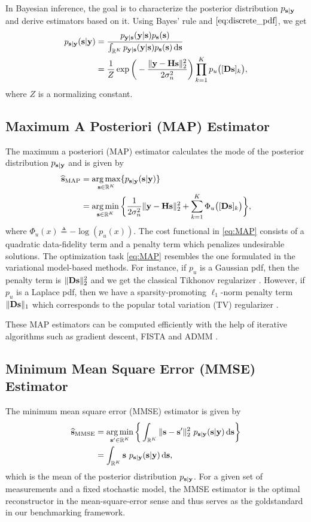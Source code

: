 \documentclass[journal]{IEEEtran}
\begin{document}
In Bayesian inference, the goal is to characterize the posterior distribution $p_{{\bf{s}}|{\bf{y}}}$ and derive estimators based on it. Using Bayes' rule and $\eqref{eq:discrete_pdf}$, we get
\begin{align}\label{eq:posterior}
    p_{{\bf{s}}|{\bf{y}}}({\bf{s}} | {\bf{y}}) &= \frac{p_{{\bf{y}}|{\bf{s}}}({\bf{y}} | {\bf{s}}) p_{{\bf{s}}}({\bf{s}})}{\int_{\mathbb{R}^K} p_{{\bf{y}}|{\bf{s}}}({\bf{y}} | {\bf{s}}) p_{{\bf{s}}}({\bf{s}}) \,\mathrm{d} {\bf{s}}}  \nonumber \\
    &= \frac{1}{Z} \exp\bigg(-\frac{\|{\bf{y}} - {\bf{H}} {\bf{s}}\|_{2}^{2}}{2 \sigma_{n}^{2}}\bigg) \prod_{k = 1}^{K} p_{u}\big([{\bf{D}} {\bf{s}}]_k\big),
\end{align}
where $Z$ is a normalizing constant.

\subsection{Maximum A Posteriori (MAP) Estimator}
The maximum a posteriori (MAP) estimator calculates the mode of the posterior distribution $p_{{\bf{s}}| {\bf{y}}}$ and is given by
\begin{align} \label{eq:MAP}
    \widehat{{\bf{s}}}_{\text{MAP}} &= \operatorname*{arg\,max}_{{\bf{s}} \in \mathbb{R}^K} \{p_{{\bf{s}} | {\bf{y}}}({\bf{s}} | {\bf{y}})\} \nonumber \\
&= \operatorname*{arg\,min}_{{\bf{s}} \in \mathbb{R}^K} \bigg\{\frac{1}{2 \sigma_{n}^{2}} \|{\bf{y}} - {\bf{H}} {\bf{s}}\|_{2}^{2} + \sum_{k=1}^{K} \Phi_{u} \big([{\bf{D}} {\bf{s}}]_k \big) \bigg\},
\end{align}
where $\Phi_u(x) \triangleq -\log(p_u(x))$. The cost functional in \eqref{eq:MAP} consists of a quadratic data-fidelity term and a penalty term which penalizes undesirable solutions. The optimization task \eqref{eq:MAP} resembles the one formulated in the variational model-based methods. For instance, if $p_u$ is a Gaussian pdf, then the penalty term is $\|{\bf{D}} {\bf{s}}\|_{2}^{2}$ and we get the classical Tikhonov regularizer \cite{tikhonov1963}. However, if $p_u$ is a Laplace pdf, then we have a sparsity-promoting $\ell_1$-norm penalty term $\|{\bf{D}} {\bf{s}}\|_{1}$ which corresponds to the popular total variation (TV) regularizer \cite{rudin1992nonlinear}.

These MAP estimators can be computed efficiently with the help of iterative algorithms such as gradient descent, FISTA \cite{beck2009fast} and ADMM \cite{boyd2011distributed}.


\subsection{Minimum Mean Square Error (MMSE) Estimator}
The minimum mean square error (MMSE) estimator is given by
\begin{align}\label{eq:MMSE}
    \widehat{{\bf{s}}}_{\text{MMSE}} &= \operatorname*{arg\,min}_{{{\bf{s}}'} \in \mathbb{R}^K} \bigg\{\int_{\mathbb{R}^K} \|{\bf{s}} - {\bf{s}}'\|_{2}^{2} \ p_{{\bf{s}}|{\bf{y}}}({\bf{s}} | {\bf{y}}) \,\mathrm{d} {\bf{s}} \bigg\} \nonumber \\
&= \int_{\mathbb{R}^K} {\bf{s}} \ p_{{\bf{s}}|{\bf{y}}}({\bf{s}} | {\bf{y}}) \,\mathrm{d} {\bf{s}},
\end{align}
which is the mean of the posterior distribution $p_{{\bf{s}}|{\bf{y}}}$. For a given set of measurements and a fixed stochastic model, the MMSE estimator is the optimal reconstructor in the mean-square-error sense and thus serves as the goldstandard in our benchmarking framework.
\end{document}
